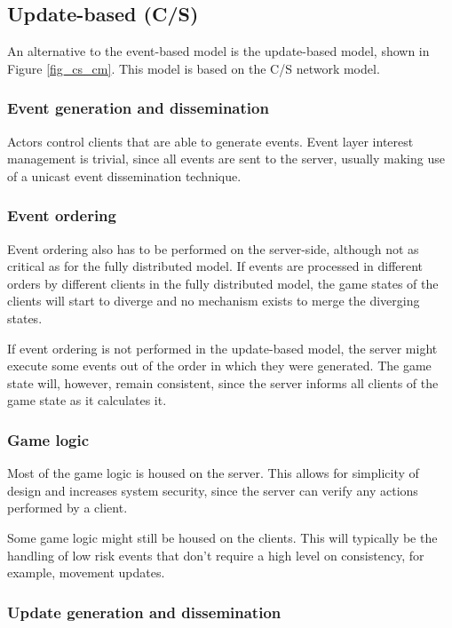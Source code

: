 \subsection{Update-based (C/S)}
\label{classic_update_based}

An alternative to the event-based model is the update-based model, shown in Figure \ref{fig_cs_cm}. This model is based on the C/S network model.

\subsubsection{Event generation and dissemination}
Actors control clients that are able to generate events. Event layer interest management is trivial, since all events are sent to the server, usually making use of a unicast event dissemination technique.

\subsubsection{Event ordering}
\label{cs_event_ordering}

Event ordering also has to be performed on the server-side, although not as critical as for the fully distributed model. If events are processed in different orders by different clients in the fully distributed model, the game states of the clients will start to diverge and no mechanism exists to merge the diverging states.

If event ordering is not performed in the update-based model, the server might execute some events out of the order in which they were generated. The game state will, however, remain consistent, since the server informs all clients of the game state as it calculates it.

\subsubsection{Game logic}
Most of the game logic is housed on the server. This allows for simplicity of design and increases system security, since the server can verify any actions performed by a client.

Some game logic might still be housed on the clients. This will typically be the handling of low risk events that don't require a high level on consistency, for example, movement updates.

\subsubsection{Update generation and dissemination}

